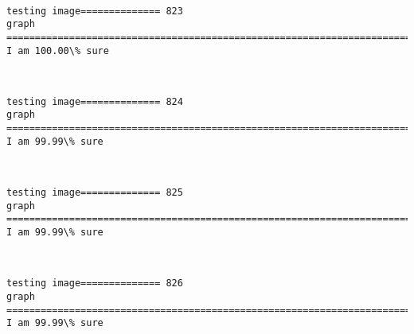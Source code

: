 \documentclass[11pt]{article}
\begin{document}
    \begin{center}
    \end{center}
    { \hspace*{\fill} \\}
    
    \begin{Verbatim}[commandchars=\\\{\}]
testing image============== 823
graph
============================================================================
I am 100.00\% sure

    \end{Verbatim}

    \begin{center}
    \end{center}
    { \hspace*{\fill} \\}
    
    \begin{Verbatim}[commandchars=\\\{\}]
testing image============== 824
graph
============================================================================
I am 99.99\% sure

    \end{Verbatim}

    \begin{center}
    \end{center}
    { \hspace*{\fill} \\}
    
    \begin{Verbatim}[commandchars=\\\{\}]
testing image============== 825
graph
============================================================================
I am 99.99\% sure

    \end{Verbatim}

    \begin{center}
    \end{center}
    { \hspace*{\fill} \\}
    
    \begin{Verbatim}[commandchars=\\\{\}]
testing image============== 826
graph
============================================================================
I am 99.99\% sure

    \end{Verbatim}
\end{document}

